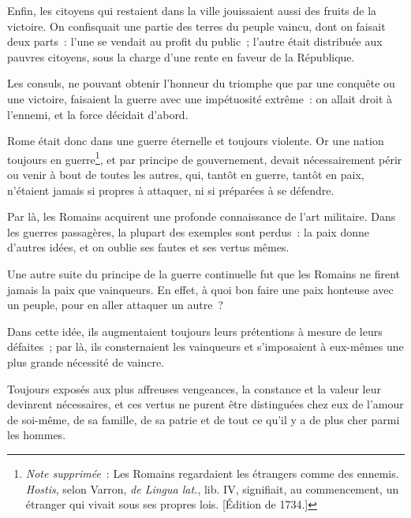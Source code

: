 \documentclass[french,twoside]{book} %
\begin{document}
Enfin, les citoyens qui restaient dans la ville jouissaient aussi des fruits de la victoire. On confisquait une partie des terres du peuple vaincu, dont on faisait deux parts : l’une se vendait au profit du public ; l’autre était distribuée aux pauvres citoyens, sous la charge d’une rente en faveur de la République.\par
Les consuls, ne pouvant obtenir l’honneur du triomphe que par une conquête ou une victoire, faisaient la guerre avec une impétuosité extrême : on allait droit à l’ennemi, et la force décidait d’abord.\par
Rome était donc dans une guerre éternelle et toujours violente. Or une nation toujours en guerre\footnote{{\itshape Note supprimée} : Les Romains regardaient les étrangers comme des ennemis. {\itshape Hostis}, selon Varron, {\itshape de Lingua lat.}, lib. IV, signifiait, au commencement, un étranger qui vivait sous ses propres lois. [Édition de 1734.]}, et par principe de gouvernement, devait nécessairement périr ou venir à bout de toutes les autres, qui, tantôt en guerre, tantôt en paix, n’étaient jamais si propres à attaquer, ni si préparées à se défendre.\par
Par là, les Romains acquirent une profonde connaissance de l’art militaire. Dans les guerres passagères, la plupart des exemples sont perdus : la paix donne d’autres idées, et on oublie ses fautes et ses vertus mêmes.\par
Une autre suite du principe de la guerre continuelle fut que les Romains ne firent jamais la paix que vainqueurs. En effet, à quoi bon faire une paix honteuse avec un peuple, pour en aller attaquer un autre ?\par
Dans cette idée, ils augmentaient toujours leurs prétentions à mesure de leurs défaites ; par là, ils consternaient les vainqueurs et s’imposaient à eux-mêmes une plus grande nécessité de vaincre.\par
Toujours exposés aux plus affreuses vengeances, la constance et la valeur leur devinrent nécessaires, et ces vertus ne purent être distinguées chez eux de l’amour de soi-même, de sa famille, de sa patrie et de tout ce qu’il y a de plus cher parmi les hommes.\par
\end{document}
